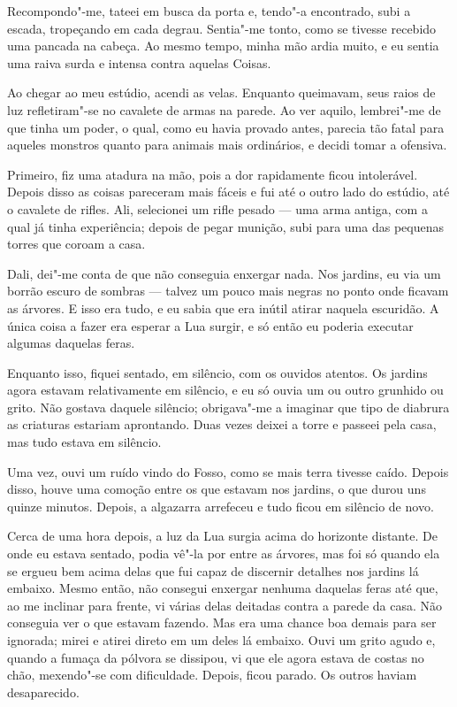 Recompondo"-me, tateei em busca da porta e, tendo"-a encontrado, subi a escada, tropeçando em cada degrau. Sentia"-me
tonto, como se tivesse recebido uma pancada na cabeça. Ao mesmo tempo, minha mão ardia muito, e eu sentia uma raiva
surda e intensa contra aquelas Coisas.

Ao chegar ao meu estúdio, acendi as velas. Enquanto queimavam, seus raios de luz refletiram"-se no cavalete de armas na
parede. Ao ver aquilo, lembrei"-me de que tinha um poder, o qual, como eu havia provado antes, parecia tão fatal para
aqueles monstros quanto para animais mais ordinários, e decidi tomar a ofensiva. 

Primeiro, fiz uma atadura na mão, pois a dor rapidamente ficou intolerável. Depois disso as coisas pareceram mais
fáceis e fui até o outro lado do estúdio, até o cavalete de rifles. Ali, selecionei um rifle pesado --- uma arma antiga,
com a qual já tinha experiência; depois de pegar munição, subi para uma das pequenas torres que coroam a casa.

Dali, dei"-me conta de que não conseguia enxergar nada. Nos jardins, eu via um borrão escuro de sombras --- talvez um
pouco mais negras no ponto onde ficavam as árvores. E isso era tudo, e eu sabia que era inútil atirar naquela
escuridão. A única coisa a fazer era esperar a Lua surgir, e só então eu poderia executar algumas daquelas feras.

Enquanto isso, fiquei sentado, em silêncio, com os ouvidos atentos. Os jardins agora estavam relativamente em silêncio,
e eu só ouvia um ou outro grunhido ou grito. Não gostava daquele silêncio; obrigava"-me a imaginar que tipo de diabrura as
criaturas estariam aprontando. Duas vezes deixei a torre e passeei pela casa, mas tudo estava em silêncio.

Uma vez, ouvi um ruído vindo do Fosso, como se mais terra tivesse caído. Depois disso, houve uma comoção entre os que
estavam nos jardins, o que durou uns quinze minutos. Depois, a algazarra arrefeceu e tudo ficou em silêncio de novo.

Cerca de uma hora depois, a luz da Lua surgia acima do horizonte distante. De onde eu estava sentado, podia vê"-la por
entre as árvores, mas foi só quando ela se ergueu bem acima delas que fui capaz de discernir detalhes nos jardins lá
embaixo. Mesmo então, não consegui enxergar nenhuma daquelas feras até que, ao me inclinar para frente, vi várias
delas deitadas contra a parede da casa. Não conseguia ver o que estavam fazendo. Mas era uma chance boa demais para ser
ignorada; mirei e atirei direto em um deles lá embaixo. Ouvi um grito agudo e, quando a fumaça da pólvora se
dissipou, vi que ele agora estava de costas no chão, mexendo"-se com dificuldade. Depois, ficou parado. Os outros haviam
desaparecido.

